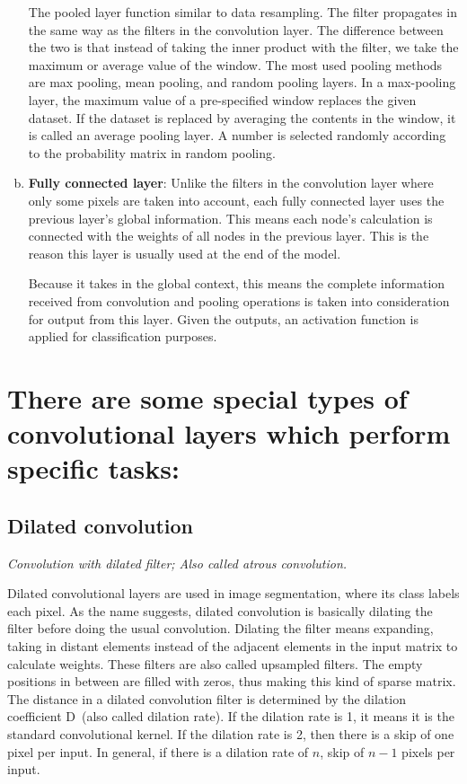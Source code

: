 \begin{enumerate}[(a)]
        The pooled layer function similar to data resampling. The filter propagates in the same way as the filters in the convolution layer. The difference between the two is that instead of taking the inner product with the filter, we take the maximum or average value of the window. The most used pooling methods are max pooling, mean pooling, and random pooling layers. In a max-pooling layer, the maximum value of a pre-specified window replaces the given dataset. If the dataset is replaced by averaging the contents in the window, it is called an average pooling layer. A number is selected randomly according to the probability matrix in random pooling.

    \item \textbf{Fully connected layer}:
        Unlike the filters in the convolution layer where only some pixels are taken into account, each fully connected layer uses the previous layer's global information. This means each node’s calculation is connected with the weights of all nodes in the previous layer. This is the reason this layer is usually used at the end of the model. 

        Because it takes in the global context, this means the complete information received from convolution and pooling operations is taken into consideration for output from this layer. Given the outputs, an activation function is applied for classification purposes.
\end{enumerate}

\section*{There are some special types of convolutional layers which perform specific tasks:}
\subsection{Dilated convolution}
\label{sec:Dilated_Convolution}
\textit{Convolution with dilated filter; Also called atrous convolution.}

    Dilated convolutional layers are used in image segmentation, where its class labels each pixel. As the name suggests, dilated convolution is basically dilating the filter before doing the usual convolution. Dilating the filter means expanding, taking in distant elements instead of the adjacent elements in the input matrix to calculate weights. These filters are also called upsampled filters. The empty positions in between are filled with zeros, thus making this kind of sparse matrix. The distance in a dilated convolution filter is determined by the dilation coefficient D~(also called dilation rate). If the dilation rate is 1, it means it is the standard convolutional kernel. If the dilation rate is 2, then there is a skip of one pixel per input. In general, if there is a dilation rate of $n$, skip of $n-1$ pixels per input.
    
